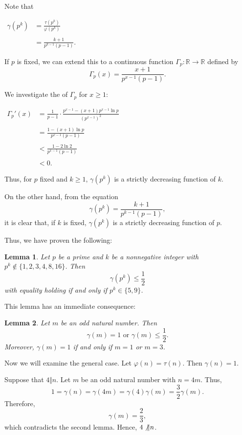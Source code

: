 \documentclass[12pt]{article}
\newtheorem{lemma}{Lemma}
\newcommand{\ds}{\displaystyle}
\renewcommand{\phi}{\varphi}
\begin{document}
Note that
\begin{center}
$\begin{array}{rl}
\gamma(p^k) & =\ds \frac{\tau(p^k)}{\phi(p^k)} \\ \\
& =\ds \frac{k+1}{p^{k-1}(p-1)}.
\end{array}$
\end{center}
If $p$ is fixed, we can extend this to a continuous function $\Gamma_p \colon \mathbb{R} \to \mathbb{R}$ defined by
\[
\Gamma_p(x)=\frac{x+1}{p^{x-1}(p-1)}.
\]

We investigate the  of $\Gamma_p$ for $x\ge 1$:
\begin{center}
$\begin{array}{rl}
{\Gamma_p}'(x) & =\ds \frac{1}{p-1} \cdot \frac{p^{x-1}-(x+1)p^{x-1}\ln p}{(p^{x-1})^2} \\ \\
& =\ds \frac{1-(x+1)\ln p}{p^{x-1}(p-1)} \\ \\
& <\ds \frac{1-2\ln 2}{p^{x-1}(p-1)} \\ \\
& <0.
\end{array}$
\end{center}
Thus, for $p$ fixed and $k\ge 1$, $\gamma(p^k)$ is a strictly decreasing function of $k$.

On the other hand, from the equation
\[
\gamma(p^k)=\frac{k+1}{p^{k-1}(p-1)},
\]
it is clear that, if $k$ is fixed, $\gamma(p^k)$ is a strictly decreasing function of $p$.

Thus, we have proven the following:

\begin{lemma}
Let $p$ be a prime and $k$ be a nonnegative integer with $p^k\notin\{1,2,3,4,8,16\}$.  Then
\[
\gamma(p^k)\le\frac{1}{2}
\]
with equality holding if and only if $p^k\in\{5,9\}$.
\end{lemma}

This lemma has an immediate consequence:

\begin{lemma}
Let $m$ be an odd natural number.  Then
\[
\gamma(m)=1 \text{ or } \gamma(m)\le\frac{1}{2}.
\]
Moreover, $\gamma(m)=1$ if and only if $m=1$ or $m=3$.
\end{lemma}

Now we will examine the general case.  Let $\phi(n)=\tau(n)$.  Then $\gamma(n)=1$.

Suppose that $4 \Vert n$.  Let $m$ be an odd natural number with $n=4m$.  Thus,
\[
1=\gamma(n)=\gamma(4m)=\gamma(4)\gamma(m)=\frac{3}{2}\gamma(m).
\]
Therefore,
\[
\gamma(m)=\frac{2}{3},
\]
which contradicts the second lemma.  Hence, $4 \not\Vert n$.
\end{document}

